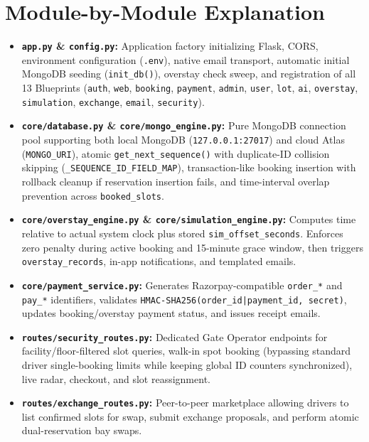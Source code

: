 \documentclass[12pt,a4paper,oneside]{report}
\begin{document}
\section{Module-by-Module Explanation}
\begin{itemize}[leftmargin=*]
  \item \textbf{\texttt{app.py} \& \texttt{config.py}:} Application factory initializing Flask, CORS, environment configuration (\texttt{.env}), native email transport, automatic initial MongoDB seeding (\texttt{init\_db()}), overstay check sweep, and registration of all 13 Blueprints (\texttt{auth}, \texttt{web}, \texttt{booking}, \texttt{payment}, \texttt{admin}, \texttt{user}, \texttt{lot}, \texttt{ai}, \texttt{overstay}, \texttt{simulation}, \texttt{exchange}, \texttt{email}, \texttt{security}).
  \item \textbf{\texttt{core/database.py} \& \texttt{core/mongo\_engine.py}:} Pure MongoDB connection pool supporting both local MongoDB (\texttt{127.0.0.1:27017}) and cloud Atlas (\texttt{MONGO\_URI}), atomic \texttt{get\_next\_sequence()} with duplicate-ID collision skipping (\texttt{\_SEQUENCE\_ID\_FIELD\_MAP}), transaction-like booking insertion with rollback cleanup if reservation insertion fails, and time-interval overlap prevention across \texttt{booked\_slots}.
  \item \textbf{\texttt{core/overstay\_engine.py} \& \texttt{core/simulation\_engine.py}:} Computes time relative to actual system clock plus stored \texttt{sim\_offset\_seconds}. Enforces zero penalty during active booking and 15-minute grace window, then triggers \texttt{overstay\_records}, in-app notifications, and templated emails.
  \item \textbf{\texttt{core/payment\_service.py}:} Generates Razorpay-compatible \texttt{order\_*} and \texttt{pay\_*} identifiers, validates \texttt{HMAC-SHA256(order\_id|payment\_id, secret)}, updates booking/overstay payment status, and issues receipt emails.
  \item \textbf{\texttt{routes/security\_routes.py}:} Dedicated Gate Operator endpoints for facility/floor-filtered slot queries, walk-in spot booking (bypassing standard driver single-booking limits while keeping global ID counters synchronized), live radar, checkout, and slot reassignment.
  \item \textbf{\texttt{routes/exchange\_routes.py}:} Peer-to-peer marketplace allowing drivers to list confirmed slots for swap, submit exchange proposals, and perform atomic dual-reservation bay swaps.
\end{itemize}
\end{document}
